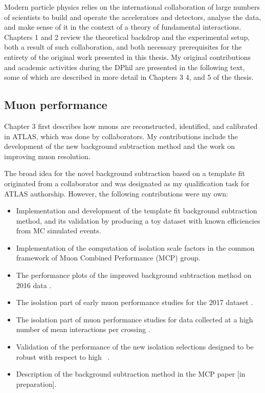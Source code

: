 \begin{originality}

Modern particle physics relies on the international collaboration
of large numbers of scientists to build and operate the accelerators and
detectors, analyse the data, and make sense of it in the
context of a theory of fundamental interactions. Chapters 1
and 2 review the theoretical backdrop and the experimental
setup, both a result of such collaboration, and both necessary
prerequisites for the entirety of the original work presented
in this thesis. My original contributions and academic
activities during the DPhil are presented in the following
text, some of which are described in more detail in Chapters 3
4, and 5 of the thesis.

\subsection*{Muon performance}

Chapter 3 first describes how muons are reconstructed,
identified, and calibrated in ATLAS, which was done by
collaborators. My contributions include the development
of the new background subtraction method and the work on
improving muon resolution.

The broad idea for the novel background subtraction
based on a template fit originated from a collaborator and 
was designated as my qualification task for ATLAS authorship.
However, the following contributions were my own:
\begin{itemize}
\item Implementation and development of the template fit background
subtraction method, and its validation by producing a toy
dataset with known efficiencies from MC simulated events.
\item Implementation of the computation of isolation scale factors in
the common framework of Muon Combined Performance (MCP) group.
\item The performance plots of the improved background
subtraction method on 2016 data \cite{Zgubic:2293041}.
\item The isolation part of early muon performance
studies for the 2017 dataset \cite{Bellomo:2282672}.
\item The isolation part of muon performance
studies for data collected at a high number of mean interactions
per crossing \cite{Kohler:2293040}.
\item Validation of the performance of the new isolation
selections designed to be robust with respect to high
\pileup~\cite{Zgubic:2320874}.
\item Description of the background subtraction method in
the MCP paper [in preparation].
\end{itemize}


\end{originality}

